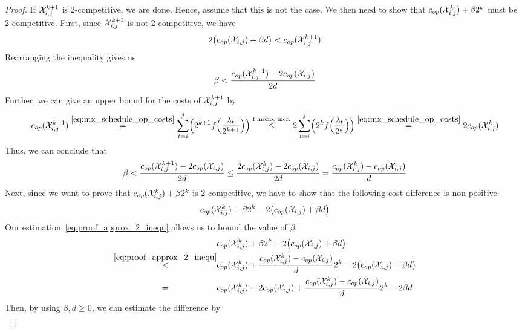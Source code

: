 \begin{proof}
If $\mathcal{X}_{i,j}^{k+1}$ is 2-competitive, we are done. Hence, assume that this is not the case. We then need to show that $c_{op}(\mathcal{X}_{i,j}^k)+\beta2^k$ must be 2-competitive. First, since $\mathcal{X}_{i,j}^{k+1}$ is not 2-competitive, we have
\begin{equation*}
	2\bigl(c_{op}(\mathcal{X}_{i,j})+\beta d\bigr)<c_{op}(\mathcal{X}_{i,j}^{k+1})
\end{equation*}
Rearranging the inequality gives us	
\begin{equation*}
	\beta<\frac{c_{op}(\mathcal{X}_{i,j}^{k+1})-2c_{op}(\mathcal{X}_{i,j})}{2d}
\end{equation*}
Further, we can give an upper bound for the costs of $\mathcal{X}_{i,j}^{k+1}$ by
\begin{equation*}
	\opcosts(\mx_{i,j}^{k+1})\stackrel{\eqref{eq:mx_schedule_op_costs}}{=}\sum_{t=i}^j\Bigl(2^{k+1}f\Bigl(\frac{\lambda_t}{2^{k+1}}\Bigr)\Bigr)\stackrel{\text{f mono.\ incr.}}{\le}2\sum_{t=i}^j\Bigl(2^kf\Bigl(\frac{\lambda_t}{2^k}\Bigr)\Bigr)\stackrel{\eqref{eq:mx_schedule_op_costs}}{=}2\opcosts(\mx_{i,j}^k)
\end{equation*}
Thus, we can conclude that
\begin{equation}\label{eq:proof_approx_2_inequ}
	\beta<\frac{c_{op}(\mathcal{X}_{i,j}^{k+1})-2c_{op}(\mathcal{X}_{i,j})}{2d}\le\frac{2c_{op}(\mathcal{X}_{i,j}^k)-2c_{op}(\mathcal{X}_{i,j})}{2d}=\frac{c_{op}(\mathcal{X}_{i,j}^k)-c_{op}(\mathcal{X}_{i,j})}{d}
\end{equation}
Next, since we want to prove that $c_{op}(\mathcal{X}_{i,j}^k)+\beta2^k$ is 2-competitive, we have to show that the following cost difference is non-positive:
\begin{align*}
	c_{op}(\mathcal{X}_{i,j}^k)+\beta2^k-2\bigl(c_{op}(\mathcal{X}_{i,j})+\beta d\bigr)
\end{align*}
Our estimation~\eqref{eq:proof_approx_2_inequ} allows us to bound the value of $\beta$:
\begin{align*}
	&\opcosts(\mx_{i,j}^k)+\beta2^k-2\bigl(\opcosts(\mx_{i,j})+\beta d\bigr)\\
	\stackrel{\eqref{eq:proof_approx_2_inequ}}{<}&\opcosts(\mx_{i,j}^k)+\frac{\opcosts(\mx_{i,j}^k)-\opcosts(\mx_{i,j})}{d}2^k-2\bigl(\opcosts(\mx_{i,j})+\beta d\bigr)\\
	\stackrel{\phantom{\eqref{eq:proof_approx_2_inequ}}}{=}&\opcosts(\mx_{i,j}^k)-2\opcosts(\mx_{i,j})+\frac{\opcosts(\mx_{i,j}^k)-\opcosts(\mx_{i,j})}{d}2^k-2\beta d
\end{align*}
Then, by using $\beta,d\ge0$, we can estimate the difference by
\begin{align*}

\end{align*}
\end{proof}
